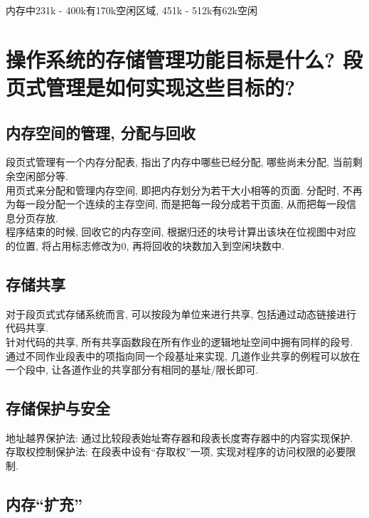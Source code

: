 \documentclass[a4paper, 12pt, notitlepage]{article}
\begin{document}
	内存中231k - 400k有170k空闲区域, 451k - 512k有62k空闲

\section{操作系统的存储管理功能目标是什么? 段页式管理是如何实现这些目标的? }

\subsection{内存空间的管理, 分配与回收}
	
	段页式管理有一个内存分配表, 指出了内存中哪些已经分配, 哪些尚未分配, 当前剩余空闲部分等. \\
	
	用页式来分配和管理内存空间, 即把内存划分为若干大小相等的页面. 分配时, 不再为每一段分配一个连续的主存空间, 而是把每一段分成若干页面, 从而把每一段信息分页存放. \\
	
	程序结束的时候, 回收它的内存空间, 根据归还的块号计算出该块在位视图中对应的位置, 将占用标志修改为0, 再将回收的块数加入到空闲块数中. \\
	
\subsection{存储共享}
	
	对于段页式式存储系统而言, 可以按段为单位来进行共享, 包括通过动态链接进行代码共享. \\
	
	针对代码的共享, 所有共享函数段在所有作业的逻辑地址空间中拥有同样的段号. \\
	
	通过不同作业段表中的项指向同一个段基址来实现, 几道作业共享的例程可以放在一个段中, 让各道作业的共享部分有相同的基址/限长即可. \\
	
\subsection{存储保护与安全}

	地址越界保护法: 通过比较段表始址寄存器和段表长度寄存器中的内容实现保护. \\
	
	存取权控制保护法: 在段表中设有“存取权”一项, 实现对程序的访问权限的必要限制. \\
	
\subsection{内存“扩充”}
\end{document}
